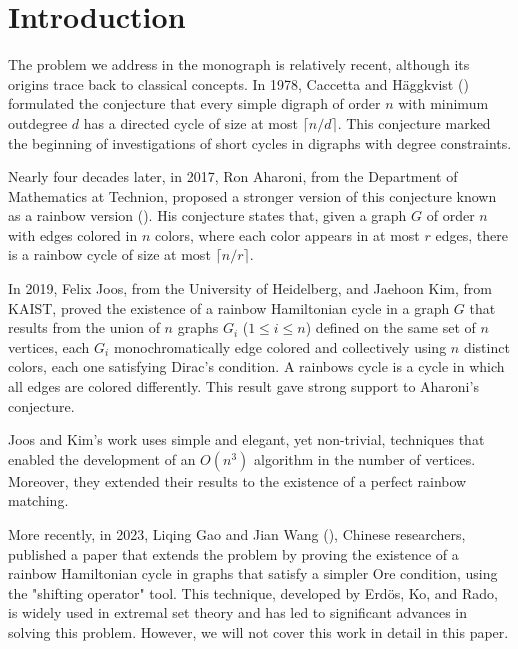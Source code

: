 
\chapter*{Introduction}

The problem we address in the monograph is relatively recent, although its origins trace back to classical concepts. 
In 1978, Caccetta and Häggkvist (\cite{nathanson2006caccettahaggkvistconjectureadditivenumber}) formulated the conjecture 
that every simple digraph of order $n$ with minimum outdegree $d$ 
has a directed cycle of size at most $\lceil n/d \rceil$. This conjecture marked the beginning of investigations 
of short cycles in digraphs with degree constraints.

Nearly four decades later, in 2017, Ron Aharoni, from the Department of Mathematics at Technion, proposed a stronger 
version of this conjecture known as a rainbow version (\cite{AharonisConjecture}). His conjecture states that, given a graph $G$ of order $n$ 
with edges colored in $n$ colors, where each color appears in at most $r$ edges, there is a rainbow cycle of size 
at most $\lceil n/r \rceil$.

In 2019, Felix Joos, from the University of Heidelberg, and Jaehoon Kim, from KAIST, 
proved the existence of a rainbow Hamiltonian cycle in a graph $G$ that results from the union of $n$ graphs
$G_i$ ($1 \leq i \leq n$) defined on the same set of $n$ vertices, each $G_i$ monochromatically edge colored
and collectively using $n$ distinct colors, each one satisfying Dirac's condition. A rainbows cycle is a cycle 
in which all edges are colored differently. This result gave strong support to Aharoni's conjecture.

Joos and Kim's work uses simple and elegant, yet non-trivial, techniques that enabled the development of an $O(n^3)$ 
algorithm in the number of vertices. Moreover, they extended their results to the existence of a perfect rainbow 
matching.

More recently, in 2023, Liqing Gao and Jian Wang (\cite{gao_wang_2024}), Chinese researchers, published a paper that extends the problem 
by proving the existence of a rainbow Hamiltonian cycle in graphs that satisfy a simpler Ore condition, using the 
"shifting operator" tool. This technique, developed by Erdös, Ko, and Rado, is widely used in extremal set theory 
and has led to significant advances in solving this problem. However, we will not cover this work in detail in 
this paper.

